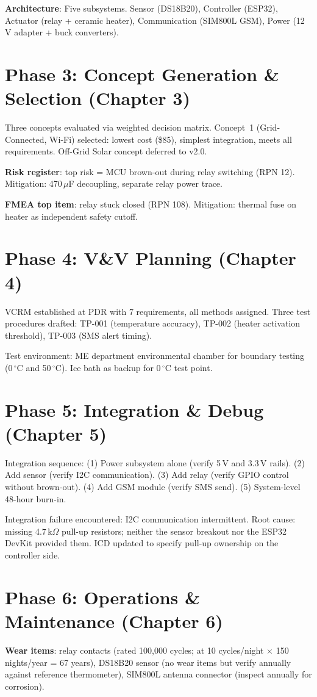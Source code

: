 \documentclass[11pt,letterpaper,twoside,openany]{book}
\newcommand{\degC}{\ensuremath{{}^{\circ}\text{C}}}
\begin{document}
\textbf{Architecture}: Five subsystems. Sensor (DS18B20), Controller (ESP32), Actuator (relay + ceramic heater), Communication (SIM800L GSM), Power (12\,V adapter + buck converters).

\section*{Phase 3: Concept Generation \& Selection (Chapter 3)}
Three concepts evaluated via weighted decision matrix. Concept~1 (Grid-Connected, Wi-Fi) selected: lowest cost (\$85), simplest integration, meets all requirements. Off-Grid Solar concept deferred to v2.0.

\textbf{Risk register}: top risk = MCU brown-out during relay switching (RPN 12). Mitigation: 470\,$\mu$F decoupling, separate relay power trace.

\textbf{FMEA top item}: relay stuck closed (RPN 108). Mitigation: thermal fuse on heater as independent safety cutoff.

\section*{Phase 4: V\&V Planning (Chapter 4)}
VCRM established at PDR with 7 requirements, all methods assigned. Three test procedures drafted: TP-001 (temperature accuracy), TP-002 (heater activation threshold), TP-003 (SMS alert timing).

Test environment: ME department environmental chamber for boundary testing (0\,\degC{} and 50\,\degC{}). Ice bath as backup for 0\,\degC{} test point.

\section*{Phase 5: Integration \& Debug (Chapter 5)}
Integration sequence: (1) Power subsystem alone (verify 5\,V and 3.3\,V rails). (2) Add sensor (verify I2C communication). (3) Add relay (verify GPIO control without brown-out). (4) Add GSM module (verify SMS send). (5) System-level 48-hour burn-in.

Integration failure encountered: I2C communication intermittent. Root cause: missing 4.7\,k$\Omega$ pull-up resistors; neither the sensor breakout nor the ESP32 DevKit provided them. ICD updated to specify pull-up ownership on the controller side.

\section*{Phase 6: Operations \& Maintenance (Chapter 6)}
\textbf{Wear items}: relay contacts (rated 100,000 cycles; at 10 cycles/night $\times$ 150 nights/year = 67 years), DS18B20 sensor (no wear items but verify annually against reference thermometer), SIM800L antenna connector (inspect annually for corrosion).
\end{document}
